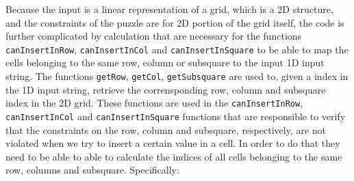 Because the input is a linear representation of a grid, which is a 2D structure, and the constraints
of the puzzle are for 2D portion of the grid itself, the code is further complicated by calculation
that are necessary for the functions \lstinline[columns=fixed]{canInsertInRow},
\lstinline[columns=fixed]{canInsertInCol} and \lstinline[columns=fixed]{canInsertInSquare} to be
able to map the cells belonging to the same row, column or subsquare to the input 1D input string.
The functions \lstinline[columns=fixed]{getRow}, \lstinline[columns=fixed]{getCol},
\lstinline[columns=fixed]{getSubsquare} are used to, given a index in the 1D input string, retrieve
the corrensponding row, column and subsquare index in the 2D grid. These functions are used in the
\lstinline[columns=fixed]{canInsertInRow}, \lstinline[columns=fixed]{canInsertInCol} and
\lstinline[columns=fixed]{canInsertInSquare} functions that are responsible to verify that the
constraints on the row, column and subsquare, respectively, are not violated when we try to insert a
certain value in a cell. In order to do that they need to be able to able to calculate the indices
of all cells belonging to the same row, columns and subsquare. Specifically:
